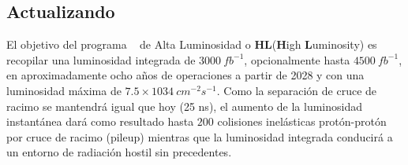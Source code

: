 %
%

\subsection{Actualizando \CMS }

El objetivo del programa \LHC ~ de Alta Luminosidad o \textbf{HL}(\textbf{H}igh \textbf{L}uminosity) es recopilar una luminosidad integrada de $3000 ~ fb^{-1}$, opcionalmente hasta $4500 ~ fb^{-1}$, en aproximadamente ocho años de operaciones a partir de 2028 y con una luminosidad máxima de $7.5 \times 1034~cm^{-2}s^{-1}$. Como la separación de cruce de racimo se mantendrá igual que hoy (25 ns), el aumento de la luminosidad instantánea dará como resultado hasta $200$ colisiones inelásticas protón-protón por cruce de racimo (pileup) mientras que la luminosidad integrada conducirá a un entorno de radiación hostil sin precedentes. %

